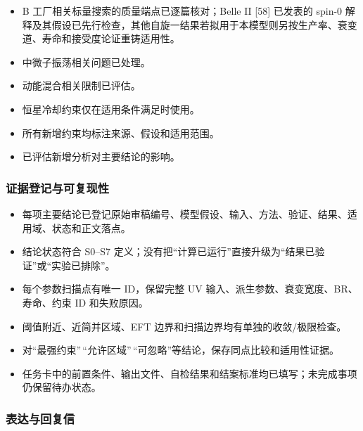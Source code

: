 \documentclass[
  chinese,
  UTF8]{ctexart}
\providecommand{\tightlist}{%
  \setlength{\itemsep}{0pt}\setlength{\parskip}{0pt}}
\begin{document}
\begin{itemize}
  \(\Gamma_i,\mathrm{BR},\Gamma_{\rm tot},c\tau\)，确认 LLP/EW
  精确搜索是否适用。
\item[$\square$]
  B 工厂相关标量搜索的质量端点已逐篇核对；Belle II {[}58{]} 已发表的
  spin-0
  解释及其假设已先行检查，其他自旋一结果若拟用于本模型则另按生产率、衰变道、寿命和接受度论证重铸适用性。
\item[$\square$]
  中微子振荡相关问题已处理。
\item[$\square$]
  动能混合相关限制已评估。
\item[$\square$]
  恒星冷却约束仅在适用条件满足时使用。
\item[$\square$]
  所有新增约束均标注来源、假设和适用范围。
\item[$\square$]
  已评估新增分析对主要结论的影响。
\end{itemize}

\subsubsection{证据登记与可复现性}\label{ux8bc1ux636eux767bux8bb0ux4e0eux53efux590dux73b0ux6027}

\begin{itemize}
\tightlist
\item[$\square$]
  每项主要结论已登记原始审稿编号、模型假设、输入、方法、验证、结果、适用域、状态和正文落点。
\item[$\square$]
  结论状态符合 S0--S7
  定义；没有把``计算已运行''直接升级为``结果已验证''或``实验已排除''。
\item[$\square$]
  每个参数扫描点有唯一 ID，保留完整 UV
  输入、派生参数、衰变宽度、BR、寿命、约束 ID 和失败原因。
\item[$\square$]
  阈值附近、近简并区域、EFT 边界和扫描边界均有单独的收敛/极限检查。
\item[$\square$]
  对``最强约束''\,``允许区域''\,``可忽略''等结论，保存同点比较和适用性证据。
\item[$\square$]
  任务卡中的前置条件、输出文件、自检结果和结案标准均已填写；未完成事项仍保留待办状态。
\end{itemize}

\subsubsection{表达与回复信}\label{ux8868ux8fbeux4e0eux56deux590dux4fe1}
\end{document}
